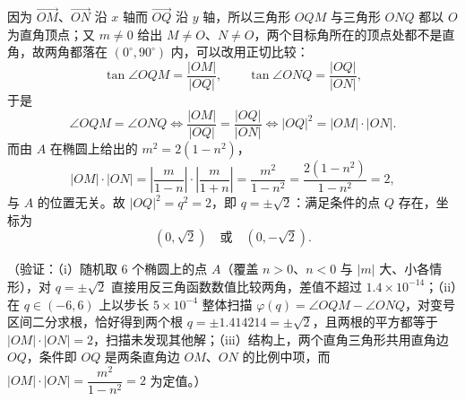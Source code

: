 \begin{answer}
因为 \(\overrightarrow{OM}\)、\(\overrightarrow{ON}\) 沿 \(x\) 轴而 \(\overrightarrow{OQ}\) 沿 \(y\) 轴，所以三角形 \(OQM\) 与三角形 \(ONQ\) 都以 \(O\) 为直角顶点；又 \(m\neq0\) 给出 \(M\neq O\)、\(N\neq O\)，两个目标角所在的顶点处都不是直角，故两角都落在 \((0^{\circ},90^{\circ})\) 内，可以改用正切比较：
\nopagebreak[4]
\[
\tan\angle OQM=\frac{|OM|}{|OQ|},\qquad \tan\angle ONQ=\frac{|OQ|}{|ON|},
\]
于是
\nopagebreak[4]
\[
\angle OQM=\angle ONQ\iff\frac{|OM|}{|OQ|}=\frac{|OQ|}{|ON|}\iff|OQ|^{2}=|OM|\cdot|ON|.
\]
而由 \(A\) 在椭圆上给出的 \(m^{2}=2(1-n^{2})\)，
\nopagebreak[4]
\[
|OM|\cdot|ON|=\left|\frac{m}{1-n}\right|\cdot\left|\frac{m}{1+n}\right|=\frac{m^{2}}{1-n^{2}}=\frac{2(1-n^{2})}{1-n^{2}}=2,
\]
与 \(A\) 的位置无关。故 \(|OQ|^{2}=q^{2}=2\)，即 \(q=\pm\sqrt{2}\)：满足条件的点 \(Q\) 存在，坐标为
\nopagebreak[4]
\[
(0,\sqrt{2})\quad\text{或}\quad(0,-\sqrt{2}).
\]

（验证：（i）随机取 \(6\) 个椭圆上的点 \(A\)（覆盖 \(n>0\)、\(n<0\) 与 \(|m|\) 大、小各情形），对 \(q=\pm\sqrt{2}\) 直接用反三角函数数值比较两角，差值不超过 \(1.4\times10^{-14}\)；（ii）在 \(q\in(-6,6)\) 上以步长 \(5\times10^{-4}\) 整体扫描 \(\varphi(q)=\angle OQM-\angle ONQ\)，对变号区间二分求根，恰好得到两个根 \(q=\pm1.414214=\pm\sqrt{2}\)，且两根的平方都等于 \(|OM|\cdot|ON|=2\)，扫描未发现其他解；（iii）结构上，两个直角三角形共用直角边 \(OQ\)，条件即 \(OQ\) 是两条直角边 \(OM\)、\(ON\) 的比例中项，而 \(|OM|\cdot|ON|=\dfrac{m^{2}}{1-n^{2}}=2\) 为定值。）



\end{answer}
